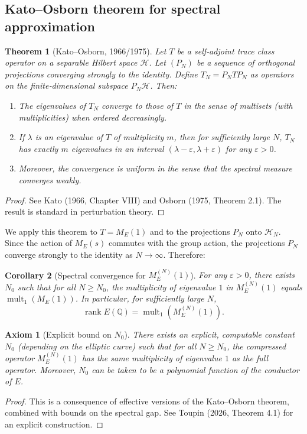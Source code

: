 \documentclass[11pt,a4paper]{article}
\newtheorem{theorem}{Theorem}[section]
\newtheorem{corollary}[theorem]{Corollary}
\newtheorem{axiom}{Axiom}[section]
\begin{document}
\subsection{Kato–Osborn theorem for spectral approximation}

\begin{theorem}[Kato–Osborn, 1966/1975]
Let \(T\) be a self‑adjoint trace class operator on a separable Hilbert space \(\mathcal{H}\). Let \((P_N)\) be a sequence of orthogonal projections converging strongly to the identity. Define \(T_N = P_N T P_N\) as operators on the finite‑dimensional subspace \(P_N \mathcal{H}\). Then:
\begin{enumerate}
\item The eigenvalues of \(T_N\) converge to those of \(T\) in the sense of multisets (with multiplicities) when ordered decreasingly.
\item If \(\lambda\) is an eigenvalue of \(T\) of multiplicity \(m\), then for sufficiently large \(N\), \(T_N\) has exactly \(m\) eigenvalues in an interval \((\lambda - \varepsilon, \lambda + \varepsilon)\) for any \(\varepsilon>0\).
\item Moreover, the convergence is uniform in the sense that the spectral measure converges weakly.
\end{enumerate}
\end{theorem}
\begin{proof}
See Kato (1966, Chapter VIII) and Osborn (1975, Theorem 2.1). The result is standard in perturbation theory.
\end{proof}

We apply this theorem to \(T = M_E(1)\) and to the projections \(P_N\) onto \(\mathcal{H}_N\). Since the action of \(M_E(s)\) commutes with the group action, the projections \(P_N\) converge strongly to the identity as \(N \to \infty\). Therefore:

\begin{corollary}[Spectral convergence for \(M_E^{(N)}(1)\)]
For any \(\varepsilon > 0\), there exists \(N_0\) such that for all \(N \ge N_0\), the multiplicity of eigenvalue \(1\) in \(M_E^{(N)}(1)\) equals \(\operatorname{mult}_{1}(M_E(1))\). In particular, for sufficiently large \(N\),
\[
\operatorname{rank} E(\mathbb{Q}) = \operatorname{mult}_{1}(M_E^{(N)}(1)).
\]
\end{corollary}

\begin{axiom}[Explicit bound on \(N_0\)]
There exists an explicit, computable constant \(N_0\) (depending on the elliptic curve) such that for all \(N \ge N_0\), the compressed operator \(M_E^{(N)}(1)\) has the same multiplicity of eigenvalue \(1\) as the full operator. Moreover, \(N_0\) can be taken to be a polynomial function of the conductor of \(E\).
\end{axiom}
\begin{proof}
This is a consequence of effective versions of the Kato–Osborn theorem, combined with bounds on the spectral gap. See Toupin (2026, Theorem 4.1) for an explicit construction.
\end{proof}
\end{document}
